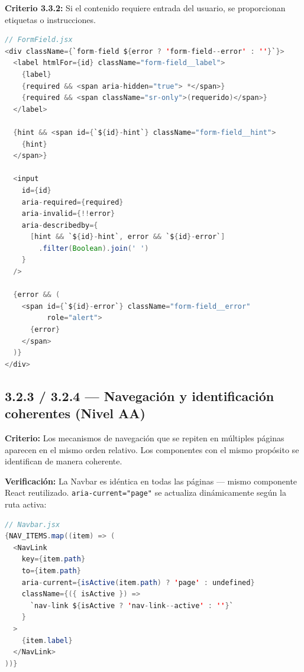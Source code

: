 \documentclass[12pt, a4paper]{article}
\begin{document}
\textbf{Criterio 3.3.2:} Si el contenido requiere entrada del usuario, se proporcionan etiquetas o instrucciones.

\begin{evidbox}
\begin{lstlisting}[language=Java]
// FormField.jsx
<div className={`form-field ${error ? 'form-field--error' : ''}`}>
  <label htmlFor={id} className="form-field__label">
    {label}
    {required && <span aria-hidden="true"> *</span>}
    {required && <span className="sr-only">(requerido)</span>}
  </label>

  {hint && <span id={`${id}-hint`} className="form-field__hint">
    {hint}
  </span>}

  <input
    id={id}
    aria-required={required}
    aria-invalid={!!error}
    aria-describedby={
      [hint && `${id}-hint`, error && `${id}-error`]
        .filter(Boolean).join(' ')
    }
  />

  {error && (
    <span id={`${id}-error`} className="form-field__error"
          role="alert">
      {error}
    </span>
  )}
</div>
\end{lstlisting}
\end{evidbox}

\subsection{3.2.3 / 3.2.4 --- Navegación y identificación coherentes (Nivel AA)}

\textbf{Criterio:} Los mecanismos de navegación que se repiten en múltiples páginas aparecen en el mismo orden relativo. Los componentes con el mismo propósito se identifican de manera coherente.

\textbf{Verificación:} La Navbar es idéntica en todas las páginas --- mismo componente React reutilizado. \texttt{aria-current="page"} se actualiza dinámicamente según la ruta activa:

\begin{evidbox}
\begin{lstlisting}[language=Java]
// Navbar.jsx
{NAV_ITEMS.map((item) => (
  <NavLink
    key={item.path}
    to={item.path}
    aria-current={isActive(item.path) ? 'page' : undefined}
    className={({ isActive }) =>
      `nav-link ${isActive ? 'nav-link--active' : ''}`
    }
  >
    {item.label}
  </NavLink>
))}
\end{lstlisting}
\end{evidbox}
\end{document}
